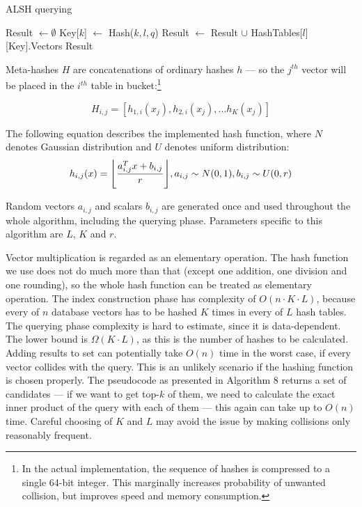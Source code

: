 \begin{algorithm}
	\caption{ALSH querying}
	\begin{algorithmic}
		\State Result $\gets \emptyset$
				\State Key[$k$] $\gets$ Hash($k, l, q$)
			\EndFor
			\State Result $\gets$ Result $\cup$ HashTables[$l$][Key].Vectors
		\EndFor
		\State \Return Result
	\end{algorithmic}
\end{algorithm}

Meta-hashes $H$ are concatenations of ordinary hashes $h$ --- so the $j^{th}$ vector will be placed in 
the $i^{th}$ table in bucket:\footnote{
In the actual implementation, the sequence of hashes is compressed to a single 64-bit integer. This
marginally increases probability of unwanted collision, but improves speed and memory consumption.
}

$$H_{i,j} = [h_{1,i}(x_j), h_{2,i}(x_j), \dots h_K(x_j)]$$

The following equation describes the implemented hash function, where
$N$ denotes Gaussian distribution and $U$ denotes uniform distribution:
\begin{equation*}
h_{i,j}(x) = \floor*{\frac{a_{i,j}^T x + b_{i,j}}{r}}, a_{i,j} \sim N(0,1), b_{i,j} \sim U(0,r)
\end{equation*}
\par
Random vectors $a_{i,j}$ and scalars $b_{i,j}$ are generated once and used throughout the whole
algorithm, including the querying phase. Parameters specific to this algorithm are $L$, $K$ and $r$.

Vector multiplication is regarded as an elementary operation.
The hash function we use does not do much more than that (except one addition,
one division and one rounding),
so the whole hash function can be treated as elementary operation.
The index construction phase has complexity of $O(n \cdot K \cdot L)$,
because every of $n$ database vectors
has to be hashed $K$ times in every of $L$ hash tables.
The querying phase complexity is hard to estimate, since it is data-dependent.
The lower bound is $\Omega(K \cdot L)$, as this is the number of hashes to be
calculated. Adding results to set can potentially take $O(n)$ time in the worst
case, if every vector collides with the query. This is an unlikely scenario if
the hashing function is chosen properly. The pseudocode as presented in Algorithm 8 returns a set
of candidates --- if we want to get top-$k$ of them, we need to calculate the exact
inner product of the query with each of them --- this again can take up to
$O(n)$ time. Careful choosing of $K$ and $L$ may avoid the issue
by making collisions only reasonably frequent.

